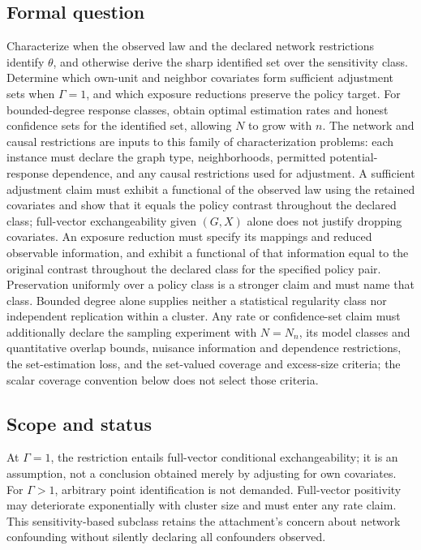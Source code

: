 \documentclass[11pt,a4paper]{article}
\begin{document}
\subsection*{Formal question}
Characterize when the observed law and the declared network restrictions identify $\theta$, and otherwise derive the sharp identified set over the sensitivity class. Determine which own-unit and neighbor covariates form sufficient adjustment sets when $\Gamma=1$, and which exposure reductions preserve the policy target. For bounded-degree response classes, obtain optimal estimation rates and honest confidence sets for the identified set, allowing $N$ to grow with $n$.
The network and causal restrictions are inputs to this family of characterization problems: each instance must declare the graph type, neighborhoods, permitted potential-response dependence, and any causal restrictions used for adjustment. A sufficient adjustment claim must exhibit a functional of the observed law using the retained covariates and show that it equals the policy contrast throughout the declared class; full-vector exchangeability given $(G,X)$ alone does not justify dropping covariates. An exposure reduction must specify its mappings and reduced observable information, and exhibit a functional of that information equal to the original contrast throughout the declared class for the specified policy pair. Preservation uniformly over a policy class is a stronger claim and must name that class. Bounded degree alone supplies neither a statistical regularity class nor independent replication within a cluster. Any rate or confidence-set claim must additionally declare the sampling experiment with $N=N_n$, its model classes and quantitative overlap bounds, nuisance information and dependence restrictions, the set-estimation loss, and the set-valued coverage and excess-size criteria; the scalar coverage convention below does not select those criteria.
\subsection*{Scope and status}
At $\Gamma=1$, the restriction entails full-vector conditional exchangeability; it is an assumption, not a conclusion obtained merely by adjusting for own covariates. For $\Gamma>1$, arbitrary point identification is not demanded. Full-vector positivity may deteriorate exponentially with cluster size and must enter any rate claim. This sensitivity-based subclass retains the attachment's concern about network confounding without silently declaring all confounders observed.
\end{document}
